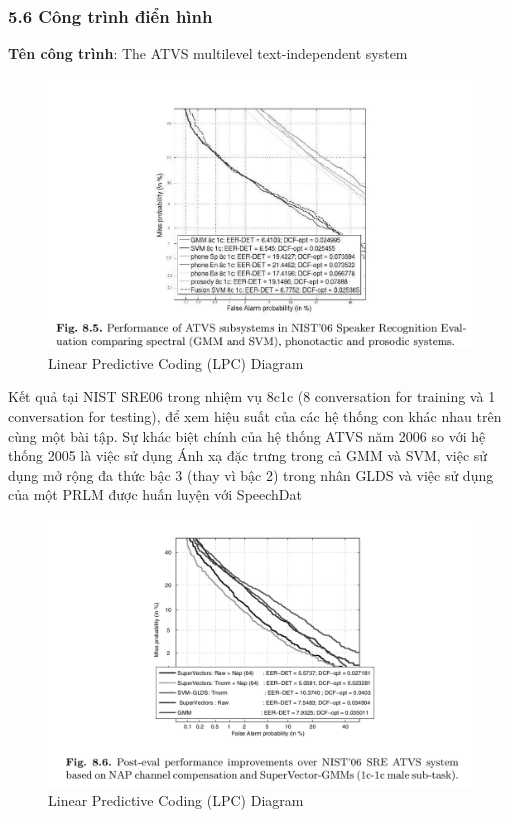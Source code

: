 \documentclass{article}
\begin{document}
	\subsubsection{5.6 Công trình điển hình}
	\textbf{Tên công trình}: The ATVS multilevel text-independent system
	\begin{figure}[H]
		\centering
		\includegraphics[width=1\linewidth]{images/figure_8_5.png}
		\caption{Linear Predictive Coding (LPC) Diagram}
		\label{fig:writing-thesis}
	\end{figure}

	Kết quả tại NIST SRE06 trong nhiệm vụ 8c1c (8 conversation for training và 1 conversation for testing), để xem hiệu suất của các hệ thống con khác nhau trên cùng một bài tập. Sự khác biệt chính của hệ thống ATVS năm 2006 so với hệ thống 2005 là việc sử dụng Ánh xạ đặc trưng trong cả GMM và SVM, việc sử dụng mở rộng đa thức bậc 3 (thay vì bậc 2) trong nhân GLDS và việc sử dụng của một PRLM được huấn luyện với SpeechDat
	
	\begin{figure}[H]
		\centering
		\includegraphics[width=1\linewidth]{images/figure_8_6.png}
		\caption{Linear Predictive Coding (LPC) Diagram}
		\label{fig:writing-thesis}
	\end{figure}
\end{document}
